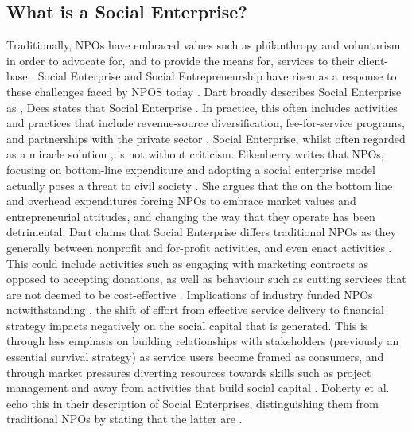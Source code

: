 \subsection{What is a Social Enterprise?}
Traditionally, NPOs have embraced values such as philanthropy and voluntarism in order to advocate for, and to provide the means for, services to their client-base \cite{alexander_adoption_1998}.  Social Enterprise and Social Entrepreneurship have risen as a response to these challenges faced by NPOS today \cite{dart_legitimacy_2004}. Dart broadly describes Social Enterprise as  \cite{dart_legitimacy_2004}, Dees states that Social Enterprise  \cite{dees_meaning_1998}. In practice, this often includes activities and practices that include revenue-source diversification, fee-for-service programs, and partnerships with the private sector \cite{dart_legitimacy_2004}.
%
Social Enterprise, whilst often regarded as a miracle solution \cite{dart_legitimacy_2004, harding_social_2004, dees_meaning_1998}, is not without criticism. Eikenberry writes that NPOs, focusing on bottom-line expenditure and adopting a social enterprise model actually poses a threat to civil society \cite{eikenberry_marketization_2004}. She argues that the on the bottom line and overhead expenditures forcing NPOs to embrace market values and entrepreneurial attitudes, and changing the way that they operate has been detrimental. Dart claims that Social Enterprise differs traditional NPOs as they generally  between nonprofit and for-profit activities, and even enact  activities \cite{dart_legitimacy_2004}. This could include activities such as engaging with marketing contracts as opposed to accepting donations, as well as behaviour such as cutting services that are not deemed to be cost-effective \cite{eikenberry_marketization_2004}. Implications of industry funded NPOs notwithstanding \cite{jacobson_lifting_2005}, the shift of effort from effective service delivery to financial strategy impacts negatively on the social capital that is generated. This is through less emphasis on building relationships with stakeholders (previously an essential survival strategy) as service users become framed as consumers, and through market pressures diverting resources towards skills such as project management and away from activities that build social capital \cite{eikenberry_marketization_2004}. Doherty et al. echo this in their description of Social Enterprises, distinguishing them from traditional NPOs by stating that the latter are  \cite{doherty_diverse_2006}.


